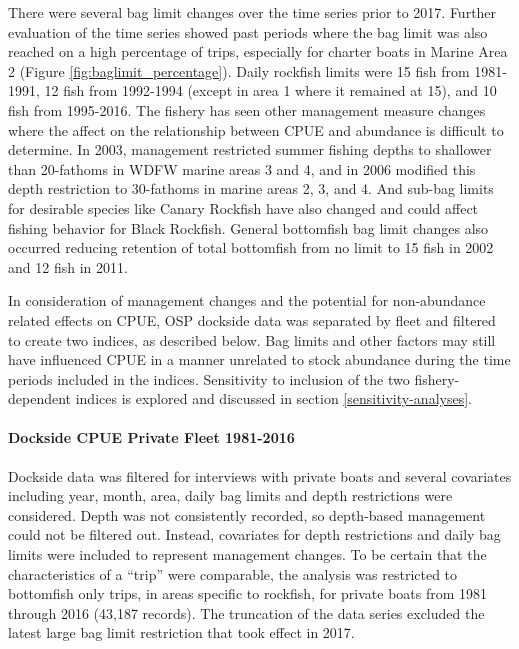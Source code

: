 \documentclass[11pt,
  letterpaper,
]{article}
\begin{document}
There were several bag limit changes over the time series prior to 2017. Further evaluation of the time series showed past periods where the bag limit was also reached on a high percentage of trips, especially for charter boats in Marine Area 2 (Figure \ref{fig:baglimit_percentage}). Daily rockfish limits were 15 fish from 1981-1991, 12 fish from 1992-1994 (except in area 1 where it remained at 15), and 10 fish from 1995-2016. The fishery has seen other management measure changes where the affect on the relationship between CPUE and abundance is difficult to determine. In 2003, management restricted summer fishing depths to shallower than 20-fathoms in WDFW marine areas 3 and 4, and in 2006 modified this depth restriction to 30-fathoms in marine areas 2, 3, and 4. And sub-bag limits for desirable species like Canary Rockfish have also changed and could affect fishing behavior for Black Rockfish. General bottomfish bag limit changes also occurred reducing retention of total bottomfish from no limit to 15 fish in 2002 and 12 fish in 2011.

In consideration of management changes and the potential for non-abundance related effects on CPUE, OSP dockside data was separated by fleet and filtered to create two indices, as described below. Bag limits and other factors may still have influenced CPUE in a manner unrelated to stock abundance during the time periods included in the indices. Sensitivity to inclusion of the two fishery-dependent indices is explored and discussed in section \ref{sensitivity-analyses}.

\hypertarget{dockside-cpue-private-fleet-1981-2016}{%
\paragraph{Dockside CPUE Private Fleet 1981-2016}\label{dockside-cpue-private-fleet-1981-2016}}

Dockside data was filtered for interviews with private boats and several covariates including year, month, area, daily bag limits and depth restrictions were considered. Depth was not consistently recorded, so depth-based management could not be filtered out. Instead, covariates for depth restrictions and daily bag limits were included to represent management changes. To be certain that the characteristics of a ``trip'' were comparable, the analysis was restricted to bottomfish only trips, in areas specific to rockfish, for private boats from 1981 through 2016 (43,187 records). The truncation of the data series excluded the latest large bag limit restriction that took effect in 2017.
\end{document}
